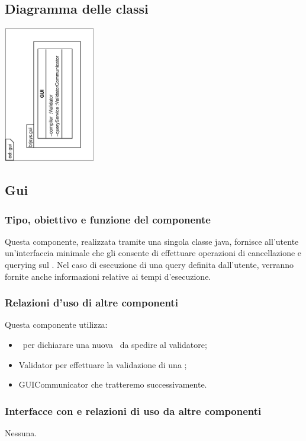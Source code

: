 \documentclass[11pt,titlepage,a4paper]{report}
\begin{document}
\subsection{Diagramma delle classi}
\begin{center}
\includegraphics[width=0.3\textwidth, angle=-90]{DiagrammaClassi/gui.eps}
\end{center}
\subsection{Gui}
\subsubsection{Tipo, obiettivo e funzione del componente}
Questa componente, realizzata tramite una singola classe java, fornisce all'utente un'interfaccia minimale che gli consente di effettuare operazioni di cancellazione e querying sul \re. Nel caso di esecuzione di una query definita dall'utente, verranno fornite anche informazioni relative ai tempi d'esecuzione.
\subsubsection{Relazioni d'uso di altre componenti}
Questa componente utilizza:
\begin{itemize}
 \item \BR\ per dichiarare una nuova \br\ da spedire al validatore;
 \item Validator per effettuare la validazione di una \br;
 \item GUICommunicator che tratteremo successivamente.
\end{itemize}
\subsubsection{Interfacce con e relazioni di uso da altre componenti}
Nessuna.
\end{document}
